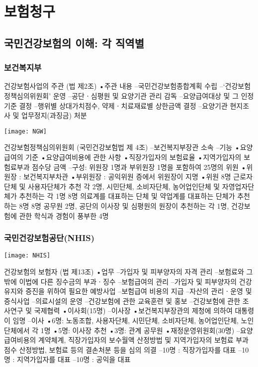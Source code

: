 \chapter{보험청구}

\section{국민건강보험의 이해: 각 직역별}
\subsection{보건복지부}
건강보험사업의 주관 (법 제2조)
•주관 내용
–국민건강보험종합계획 수립
–‘건강보험정책심의위원회’ 운영
–공단ㆍ심평원 및 요양기관 관리 감독
–요양급여대상 및 그 인정기준 결정
–행위별 상대가치점수, 약제ㆍ치료재료별 상한금액 결정
–요양기관 현지조사 및 업무정지(과징금) 처분
\begin{center}
\texttt{[image: NGW]}
\end{center}
건강보험정책심의위원회 (국민건강보험법 제 4조)
–보건복지부장관 소속
–기능
•요양급여의 기준
•요양급여비용에 관한 사항
•직장가입자의 보험료율
•지역가입자의 보험료부과 점수당 금액
–구성: 위원장 1명과 부위원장 1명을 포함하여 25명의 위원
•위원장 : 보건복지부차관
•부위원장 : 공익위원 증에서 위원장이 지명
•위원
8명 근로자단체 및 사용자단체가 추천 각 2명,
시민단체, 소비자단체, 농어업인단체 및 자영업자단체가 추천하는 각 1명
8명 의료계를 대표하는 단체 및 약업계를 대표하는 단체가 추천하는 8명
8명 공무원 2명, 공단의 이사장 및 심평원의 원장이 추천하는 각 1명,
건강보험에 관한 학식과 경험이 풍부한 4명


\subsection{국민건강보험공단(NHIS)}
\begin{center}
\texttt{[image: NHIS]}
\end{center}
건강보험의 보험자 (법 제13조)
•업무
–가입자 및 피부양자의 자격 관리
–보험료와 그 밖에 이법에 다른 징수금의 부과ㆍ징수
–보험급여의 관리
–가입자 및 피부양자의 건강 유지와 증진을 위하여 필요한 예방사업
–보험급여 비용의 지급
–자산의 관리ㆍ운영 및 증식사업
–의료시설의 운영
–건강보험에 관한 교육훈련 및 홍보
–건강보험에 관한 조사연구 및 국제협력
•이사회(15명)
–이사장
•보건복지부장관의 제청에 의하여 대통령이 임명
–이사
•6명: 노동조합, 사용자단체, 시민단체, 소비자단체, 농어업인단체, 노인단체에서 각 1명
•5명: 이사장 추천
•3명: 관계 공무원
•재정운영위원회(30명)
–요양급여비용의 계약체계, 직장가입자의 보수월액 산정방법 및 지역가입자의 보험료 부과점수 산정방법, 보험료 등의 결손처분 등을 심의 의결
–10명 : 직장가입자를 대표
–10명 : 지역가입자를 대표
–10명 : 공익을 대표

